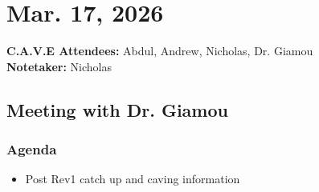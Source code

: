 	\pagebreak
	\section*{Mar. 17, 2026}

	\textbf{C.A.V.E Attendees:} Abdul, Andrew, Nicholas, Dr. Giamou\\
	\textbf{Notetaker:} Nicholas

	\subsection*{Meeting with Dr. Giamou}
		\subsubsection*{Agenda}
			\begin{itemize}
				\item Post Rev1 catch up and caving information
			\end{itemize}

